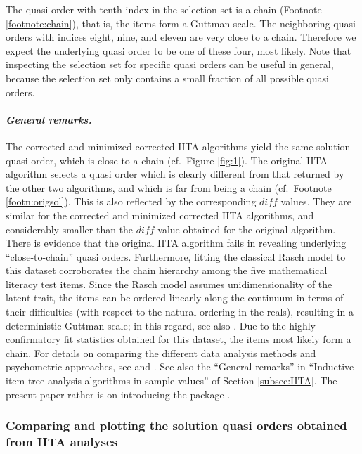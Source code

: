 \documentclass[nojss]{jss}
\begin{document}
The quasi order with tenth index in the selection set is a chain (Footnote \ref{footnote:chain}), 
that is, the items form a Guttman scale. The neighboring quasi orders with indices eight, nine, 
and eleven are very close to a chain. 
Therefore we expect the underlying quasi order to be one of these four, most likely. 
Note that inspecting the selection set for specific quasi orders can be useful in general, 
because the selection set only contains a small fraction of all possible quasi orders.

\paragraph{\it General remarks.}
The corrected and minimized corrected IITA algorithms yield the same solution quasi order, which is close to a chain (cf.\ Figure \ref{fig:1}). The original IITA algorithm selects a quasi order
which is clearly different from that returned by the other two algorithms, and which is far from being a chain (cf.\ Footnote \ref{footn:origsol}). 
This is also reflected by the corresponding $\mathit{diff}$
values. They are similar for the corrected and minimized corrected IITA algorithms, and considerably smaller than the $\mathit{diff}$ value obtained for the original algorithm.
There is evidence that the original IITA algorithm fails in revealing underlying ``close-to-chain'' quasi orders.
Furthermore, fitting the classical Rasch model to this dataset corroborates the chain hierarchy among the five mathematical literacy test items. Since the Rasch model assumes unidimensionality of the latent trait, the items can be ordered linearly along the continuum in terms of their difficulties (with respect to the natural ordering in the reals), resulting in a deterministic Guttman scale; in this 
regard, see also \cite{U:07}. Due to the highly confirmatory fit statistics obtained for this dataset, 
the items most likely form a chain.
For details on comparing the different data analysis methods and psychometric approaches, see  \cite{SU:09} and \cite{US:10}. See also the ``General remarks'' in 
``Inductive item tree analysis algorithms in sample values'' of Section \ref{subsec:IITA}.
The present paper rather is on introducing the  package .

\subsubsection{Comparing and plotting the solution quasi orders obtained from IITA analyses}
\end{document}
